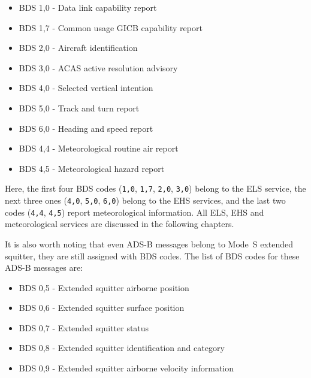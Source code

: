 \begin{itemize}
  \item BDS 1,0 - Data link capability report
  \item BDS 1,7 - Common usage GICB capability report
  \item BDS 2,0 - Aircraft identification
  \item BDS 3,0 - ACAS active resolution advisory
  \item BDS 4,0 - Selected vertical intention
  \item BDS 5,0 - Track and turn report
  \item BDS 6,0 - Heading and speed report
  \item BDS 4,4 - Meteorological routine air report
  \item BDS 4,5 - Meteorological hazard report
\end{itemize}

Here, the first four BDS codes (\texttt{1,0}, \texttt{1,7}, \texttt{2,0}, \texttt{3,0}) belong to the ELS service, the next three ones (\texttt{4,0}, \texttt{5,0}, \texttt{6,0}) belong to the EHS services, and the last two codes (\texttt{4,4}, \texttt{4,5}) report meteorological information. All ELS, EHS and meteorological services are discussed in the following chapters.

It is also worth noting that even ADS-B messages belong to Mode~S extended squitter, they are still assigned with BDS codes. The list of BDS codes for these ADS-B messages are:

\begin{itemize}
  \item BDS 0,5 - Extended squitter airborne position
  \item BDS 0,6 - Extended squitter surface position
  \item BDS 0,7 - Extended squitter status
  \item BDS 0,8 - Extended squitter identification and category
  \item BDS 0,9 - Extended squitter airborne velocity information
\end{itemize}